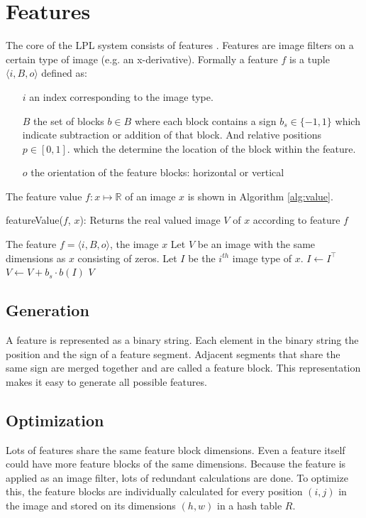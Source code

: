 \documentclass[a4paper,11pt]{article}
\begin{document}
\section*{Features}
The core of the LPL system consists of features \cite{dlagnekov_thesis,
zhang,naturaltext}. Features are image filters on a certain type of image
(e.g.  an x-derivative). Formally a feature $f$ is a tuple $\langle i, B, o
\rangle$ defined as:
\begin{itemize}
	\item[$i$]{an index corresponding to the image type.}
	\item[$B$]{the set of blocks $b \in B$ where each block contains a sign
	$b_s \in \{-1,1\}$ which indicate subtraction or addition of that block. And
	relative positions $p \in [0,1]$. which the determine the location of the block
	within the feature.}
	\item[$o$]{the orientation of the feature blocks: horizontal or vertical}
\end{itemize}
The feature value $f:x\mapsto\mathbb{R}$ of an image $x$ is shown in Algorithm
\ref{alg:value}.
\begin{algorithm}
	\caption{featureValue($f$, $x$): Returns the real valued image $V$ of $x$ according to feature $f$}
	\begin{algorithmic}[1]
	\REQUIRE The feature $f = \langle i, B, o \rangle$, the image $x$
	\medskip
	\STATE Let $V$ be an image with the same dimensions as $x$ consisting of zeros.
	\STATE Let $I$ be the $i^{th}$ image type of $x$.
		\STATE $I \leftarrow I^\top$
	\ENDIF
		\STATE $V \leftarrow V + b_s \cdot b(I)$
	\ENDFOR
	\RETURN $V$
	\end{algorithmic}
\label{alg:value}
\end{algorithm}


\subsection*{Generation}
A feature is represented as a binary string. Each element in the binary string
the position and the sign of a feature segment. Adjacent segments that share
the same sign are merged together and are called a feature block. This
representation makes it easy to generate all possible features.

\subsection*{Optimization}
Lots of features share the same feature block dimensions. Even a feature
itself could have more feature blocks of the same dimensions. Because the
feature is applied as an image filter, lots of redundant calculations are done.
To optimize this, the feature blocks are individually calculated for every
position $(i,j)$ in the image and stored on its dimensions $(h,w)$ in a hash
table $R$.
\end{document}
